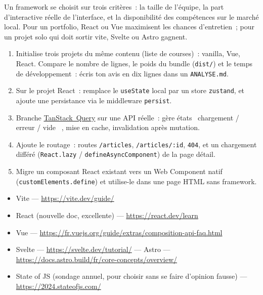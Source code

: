 \documentclass[12pt,a4paper,twoside,openright]{book}
\newcommand{\link}[2]{\href{#2}{#1}}
\begin{document}
\begin{note}
Un framework se choisit sur trois crit\`eres~: la taille de l'\'equipe, la part d'interactive r\'eelle
de l'interface, et la disponibilit\'e des comp\'etences sur le march\'e local. Pour un portfolio,
React ou Vue maximisent les chances d'entretien~; pour un projet solo qui doit sortir vite,
Svelte ou Astro gagnent.
\end{note}

\begin{exercice}
\begin{enumerate}
  \item Initialise trois projets du m\^eme contenu (liste de courses)~: vanilla, Vue, React.
        Compare le nombre de lignes, le poids du bundle (\verb|dist/|) et le temps de
        d\'eveloppement~: \'ecris ton avis en dix lignes dans un \verb|ANALYSE.md|.
  \item Sur le projet React~: remplace le \verb|useState| local par un store \verb|zustand|,
        et ajoute une persistance via le middleware \verb|persist|.
  \item Branche \link{TanStack~Query}{https://tanstack.com/query} sur une API r\'eelle~: g\`ere
        \'etats \og ~chargement / erreur / vide~ \fg{}, mise en cache, invalidation apr\`es mutation.
  \item Ajoute le routage~: routes \verb|/articles|, \verb|/articles/:id|, \verb|404|,
        et un chargement diff\'er\'e (\verb|React.lazy| / \verb|defineAsyncComponent|) de la page d\'etail.
  \item Migre un composant React existant vers un Web Component natif (\verb|customElements.define|)
        et utilise-le dans une page HTML sans framework.
\end{enumerate}
\end{exercice}

\begin{ressources}
\begin{itemize}
  \item Vite --- \url{https://vite.dev/guide/}
  \item React (nouvelle doc, excellente) --- \url{https://react.dev/learn}
  \item Vue --- \url{https://fr.vuejs.org/guide/extras/composition-api-faq.html}
  \item Svelte --- \url{https://svelte.dev/tutorial/} --- Astro --- \url{https://docs.astro.build/fr/core-concepts/overview/}
  \item State of JS (sondage annuel, pour choisir sans se faire d'opinion fausse) --- \url{https://2024.stateofjs.com/}
\end{itemize}
\end{ressources}
\end{document}
